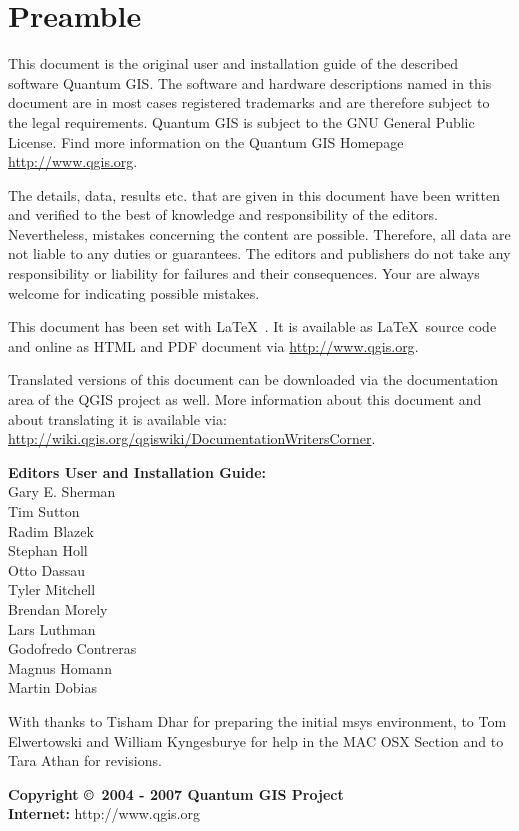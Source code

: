\thispagestyle{empty}
\section*{Preamble}

\vspace{1cm}

This document is the original user and installation guide of the described 
software Quantum GIS. The software and hardware descriptions named in this 
document are in most cases registered trademarks and are therefore subject 
to the legal requirements. Quantum GIS is subject to the GNU General Public 
License. Find more information on the Quantum GIS Homepage \url{http://www.qgis.org}.

The details, data, results etc. that are given in this document have been 
written and verified to the best of knowledge and responsibility of the 
editors. Nevertheless, mistakes concerning the content are possible. 
Therefore, all data are not liable to any duties or guarantees. The editors 
and publishers do not take any responsibility or liability for failures and 
their consequences. Your are always welcome for indicating possible mistakes.

This document has been set with \LaTeX~. It is available as \LaTeX~source 
code and online as HTML and PDF document via \url{http://www.qgis.org}.

Translated versions of this document can be downloaded via the documentation 
area of the QGIS project as well. More information about this document and 
about translating it is available via: \\
\url{http://wiki.qgis.org/qgiswiki/DocumentationWritersCorner}. 

\vspace{1cm}

\begin{flushleft}
\textbf{Editors User and Installation Guide:} 
\\ Gary E. Sherman 
\\ Tim Sutton 
\\ Radim Blazek 
\\ Stephan Holl 
\\ Otto Dassau 
\\ Tyler Mitchell 
\\ Brendan Morely 
\\ Lars Luthman 
\\ Godofredo Contreras 
\\ Magnus Homann
\\ Martin Dobias

With thanks to Tisham Dhar for preparing the initial msys environment, to Tom 
Elwertowski and William Kyngesburye for help in the MAC OSX Section and to Tara 
Athan for revisions.

\vspace{1cm}

\textbf{Copyright \copyright~2004 - 2007 Quantum GIS Project} \\
\textbf{Internet:} http://www.qgis.org
\end{flushleft}

